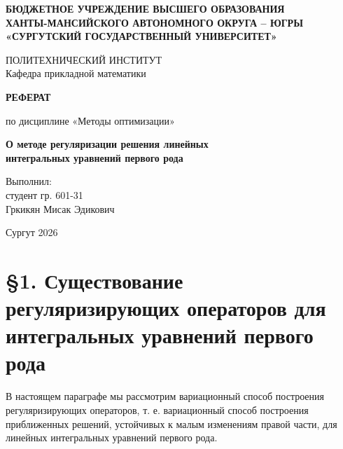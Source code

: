 \documentclass[a4paper,14pt]{extarticle}
\begin{document}
\begin{titlepage}
    \begin{center}
        \textbf{БЮДЖЕТНОЕ УЧРЕЖДЕНИЕ ВЫСШЕГО ОБРАЗОВАНИЯ}\\
        \textbf{ХАНТЫ-МАНСИЙСКОГО АВТОНОМНОГО ОКРУГА -- ЮГРЫ}\\
        \textbf{«СУРГУТСКИЙ ГОСУДАРСТВЕННЫЙ УНИВЕРСИТЕТ»}
        
        \vspace{0.5cm}
        ПОЛИТЕХНИЧЕСКИЙ ИНСТИТУТ\\
        Кафедра прикладной математики
        
        \vspace{4cm}
        \textbf{РЕФЕРАТ}
        
        \vspace{0.5cm}
        по дисциплине «Методы оптимизации»
        
        \vspace{0.5cm}
        {\large \textbf{О методе регуляризации решения линейных}}\\
        {\large \textbf{интегральных уравнений первого рода}}
    \end{center}
    
    \vspace{5cm}
    \begin{flushright}
        \begin{minipage}{0.5\textwidth}
            \raggedright
            Выполнил:\\
            студент гр. 601-31\\
            Гркикян Мисак Эдикович
        \end{minipage}
    \end{flushright}
    
    \vfill
    \begin{center}
        Сургут 2026
    \end{center}
\end{titlepage}

\newpage

\tableofcontents
\newpage

\section{\S 1. Существование регуляризирующих операторов для интегральных уравнений первого рода}

В настоящем параграфе мы рассмотрим вариационный способ построения регуляризирующих операторов, т. е. вариационный способ построения приближенных решений, устойчивых к малым изменениям правой части, для линейных интегральных уравнений первого рода.
\end{document}
